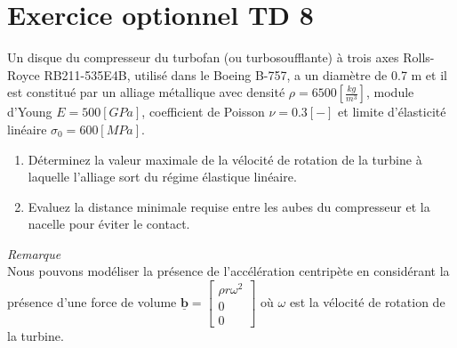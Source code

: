 \documentclass
[
a4paper,                      %
twoside,					  %
12pt,                         %
abstract,		      %
fleqn,                        %
]
{scrartcl} %
\begin{document}


\setcounter{page}{1}


\clearscrheadings
\pagestyle{scrheadings}
\manualmark
\ofoot{\\\pagemark} %
\ifoot{}
\ihead{}
\setheadtopline{2pt}
\setheadsepline{0.5pt}
\setfootsepline{0.5pt}

\section*{Exercice optionnel TD 8}

Un disque du compresseur du turbofan (ou turbosoufflante) \`a trois axes Rolls-Royce RB211-535E4B, utilis\'e dans le Boeing B-757, a un diam\`etre de 0.7 m et il est constitu\'e par un alliage m\'etallique avec densit\'e $\rho=6500\left[\frac{kg}{m^{3}}\right]$, module d'Young $E=500\left[GPa\right]$, coefficient de Poisson $\nu=0.3\left[-\right]$ et limite d'\'elasticit\'e lin\'eaire $\sigma_{0}=600\left[MPa\right]$.

\begin{enumerate}
\item D\'eterminez la valeur maximale de la v\'elocit\'e de rotation de la turbine \`a laquelle l'alliage sort du r\'egime \'elastique lin\'eaire.
\item Evaluez la distance minimale requise entre les aubes du compresseur et la nacelle pour \'eviter le contact.
\end{enumerate}

\textit{Remarque}\\
Nous pouvons mod\'eliser la pr\'esence de l'acc\'el\'eration centrip\`ete en consid\'erant la pr\'esence d'une force de volume $\underline{\mathbf{b}}=\begin{bmatrix}\rho r\omega^{2}\\0\\0\end{bmatrix}$ o\`u $\omega$ est la v\'elocit\'e de rotation de la turbine.\\
\end{document}
